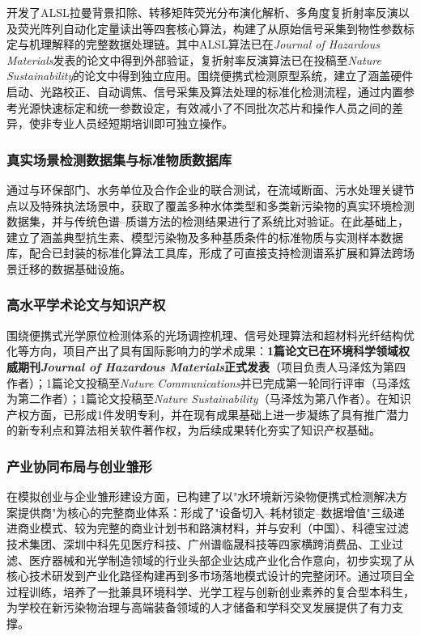 \documentclass[12pt,a4paper]{article}
\begin{document}
开发了ALSL拉曼背景扣除、转移矩阵荧光分布演化解析、多角度复折射率反演以及荧光阵列自动化定量读出等四套核心算法，构建了从原始信号采集到物性参数标定与机理解释的完整数据处理链。其中ALSL算法已在\textit{Journal of Hazardous Materials}发表的论文中得到外部验证，复折射率反演算法已在投稿至\textit{Nature Sustainability}的论文中得到独立应用。围绕便携式检测原型系统，建立了涵盖硬件启动、光路校正、自动调焦、信号采集及算法处理的标准化检测流程，通过内置参考光源快速标定和统一参数设定，有效减小了不同批次芯片和操作人员之间的差异，使非专业人员经短期培训即可独立操作。

\subsubsection{真实场景检测数据集与标准物质数据库}

通过与环保部门、水务单位及合作企业的联合测试，在流域断面、污水处理关键节点以及特殊执法场景中，获取了覆盖多种水体类型和多类新污染物的真实环境检测数据集，并与传统色谱--质谱方法的检测结果进行了系统比对验证。在此基础上，建立了涵盖典型抗生素、模型污染物及多种基质条件的标准物质与实测样本数据库，配合已封装的标准化算法工具库，形成了可直接支持检测谱系扩展和算法跨场景迁移的数据基础设施。

\subsubsection{高水平学术论文与知识产权}

围绕便携式光学原位检测体系的光场调控机理、信号处理算法和超材料光纤结构优化等方向，项目产出了具有国际影响力的学术成果：\textbf{1篇论文已在环境科学领域权威期刊\textit{Journal of Hazardous Materials}正式发表}（项目负责人马泽炫为第四作者）；1篇论文投稿至\textit{Nature Communications}并已完成第一轮同行评审（马泽炫为第二作者）；1篇论文投稿至\textit{Nature Sustainability}（马泽炫为第八作者）。在知识产权方面，已形成1件发明专利，并在现有成果基础上进一步凝练了具有推广潜力的新专利点和算法相关软件著作权，为后续成果转化夯实了知识产权基础。

\subsubsection{产业协同布局与创业雏形}

在模拟创业与企业雏形建设方面，已构建了以"水环境新污染物便携式检测解决方案提供商"为核心的完整商业体系：形成了"设备切入--耗材锁定--数据增值"三级递进商业模式、较为完整的商业计划书和路演材料，并与安利（中国）、科德宝过滤技术集团、深圳中科先见医疗科技、广州谱临晟科技等四家横跨消费品、工业过滤、医疗器械和光学制造领域的行业头部企业达成产业化合作意向，初步实现了从核心技术研发到产业化路径构建再到多市场落地模式设计的完整闭环。通过项目全过程训练，培养了一批兼具环境科学、光学工程与创新创业素养的复合型本科生，为学校在新污染物治理与高端装备领域的人才储备和学科交叉发展提供了有力支撑。
\end{document}

